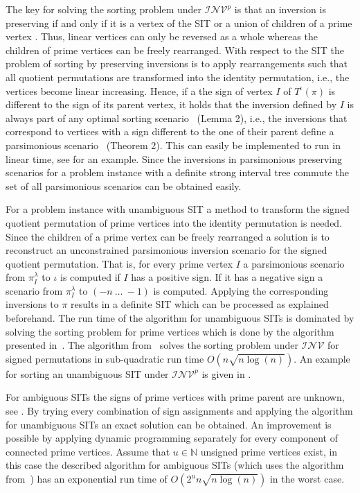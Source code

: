 \documentclass{svmult}
\newcommand{\m}[1]{\mathcal{#1}}
\begin{document}
The key for solving the sorting problem under $\m{INV}^p$ is that 
an inversion is preserving if and only if it is a vertex of the SIT or a union 
of children of a prime vertex \cite{Berard_2007}. Thus, linear vertices can 
only be reversed as a whole whereas the children of prime vertices can be freely rearranged. With respect to the SIT the problem of sorting by preserving inversions 
is to apply rearrangements such that all quotient permutations are transformed 
into the identity permutation, i.e., the vertices become linear increasing. 
Hence, if a the sign of vertex $I$ of ${T}^\iota(\pi)$ is different to the sign of its
parent vertex, it holds that the inversion defined by $I$ is always part of any
optimal sorting scenario~\cite{Berard_2007} (Lemma 2), i.e., 
the inversions that correspond to vertices with a sign different to the one of their parent define a parsimonious scenario~\cite{Berard_2007} (Theorem 2).
This can easily be implemented to run in linear time, see  for an example. 
Since the inversions in parsimonious preserving scenarios for a problem instance with a definite strong interval tree commute the set of all parsimonious scenarios can be obtained easily.

For a problem instance with unambiguous SIT a method to transform the signed quotient
permutation of prime vertices into the identity permutation is needed. 
Since the children of a prime vertex can be freely rearranged a solution is 
to reconstruct an unconstrained parsimonious inversion scenario for the signed quotient 
permutation. That is, for every prime vertex $I$ a parsimonious scenario from $\pi^\lambda_I$ to $\iota$ is computed 
if $I$ has a positive sign. If it has a
negative sign a scenario from $\pi^\lambda_{I}$ to $(-{n}~\ldots~-{1})$ is
computed.
Applying the corresponding inversions to $\pi$ results in a definite SIT which can be processed as explained beforehand.
%
The run time of the algorithm for unambiguous SITs is dominated by solving the sorting problem for prime vertices
which is done by the algorithm presented in~\cite{Tannier_2007}.
The algorithm from~\cite{Tannier_2007} solves the sorting problem under
$\m{INV}$ for signed permutations in  sub-quadratic run time
$O(n\sqrt{n\log{(n)}})$. An example for sorting an
unambiguous SIT under $\m{INV}^p$ is given in .

For ambiguous SITs the signs of prime vertices with prime parent are unknown,
see . 
By trying every combination of sign assignments and applying the algorithm for unambiguous SITs an exact solution can be obtained. 
An improvement is possible by applying dynamic programming separately for every component of connected 
prime vertices. 
Assume that $u\in\mathbb{N}$ unsigned prime vertices exist, in this
case the described algorithm for ambiguous SITs (which uses the algorithm
from~\cite{Tannier_2007}) has an exponential run time of
$O(2^{u}n\sqrt{n\log{(n)}})$ in the worst case.
\end{document}
